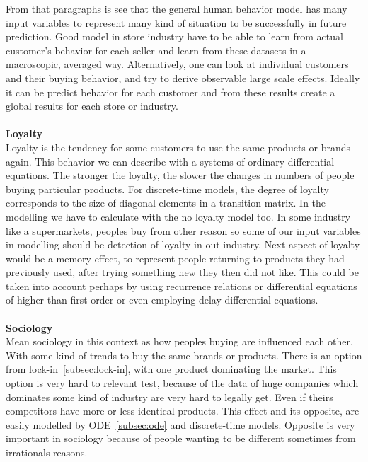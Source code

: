 From that paragraphs is see that the general human behavior model has many input variables to represent many kind
of situation to be successfully in future prediction.
Good model in store industry have to be able to learn from actual customer's behavior for each seller and learn
from these datasets in a macroscopic, averaged way.
Alternatively, one can look at individual customers and their buying behavior, and try to derive observable large scale effects.
Ideally it can be predict behavior for each customer and from these results create a global results for each store or industry.\\
\\
\textbf{Loyalty} \label{subsec:loyalty}\\
Loyalty is the tendency for some customers to use the same products or brands again.
This behavior we can describe with a systems of ordinary differential equations.
The stronger the loyalty, the slower the changes in numbers of people buying particular products.
For discrete-time models, the degree of loyalty corresponds to the size of diagonal elements in a transition matrix.
In the modelling we have to calculate with the no loyalty model too.
In some industry like a supermarkets, peoples buy from other reason so some of our input variables in modelling should be
detection of loyalty in out industry.
Next aspect of loyalty would be a memory effect, to represent people returning to products they had previously used,
after trying something new they then did not like.
This could be taken into account perhaps by using recurrence relations or differential equations of higher than first order or even employing
delay-differential equations.\\
\\
\textbf{Sociology} \label{subsec:sociology}\\
Mean sociology in this context as how peoples buying are influenced each other.
With some kind of trends to buy the same brands or products.
There is an option from lock-in~\ref{subsec:lock-in}, with one product dominating the market.
This option is very hard to relevant test, because of the data of huge companies which dominates some kind
of industry are very hard to legally get.
Even if theirs competitors have more or less identical products.
This effect and its opposite, are easily modelled by ODE~\ref{subsec:ode} and discrete-time models.
Opposite is very important in sociology because of people wanting to be different sometimes from irrationals reasons.

